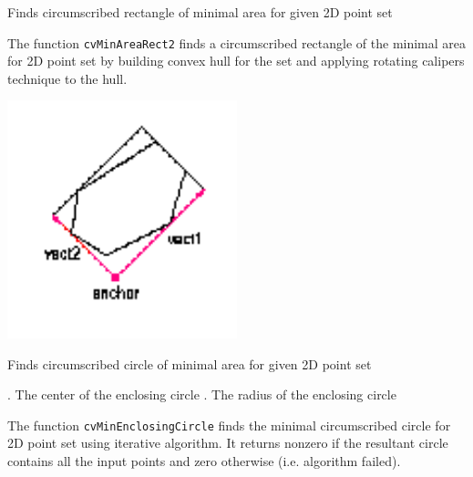 \label{MinAreaRect2}

Finds circumscribed rectangle of minimal area for given 2D point set


\begin{description}
\end{description}

The function \texttt{cvMinAreaRect2} finds a circumscribed rectangle of the minimal area for 2D point set by building convex hull for the set and applying rotating calipers technique to the hull.

\includegraphics[width=0.5\textwidth]{pics/minareabox.png}

\label{MinEnclosingCircle}

Finds circumscribed circle of minimal area for given 2D point set


\begin{description}
. The center of the enclosing circle
. The radius of the enclosing circle
\end{description}

The function \texttt{cvMinEnclosingCircle} finds the minimal circumscribed
circle for 2D point set using iterative algorithm. It returns nonzero
if the resultant circle contains all the input points and zero otherwise
(i.e. algorithm failed).

